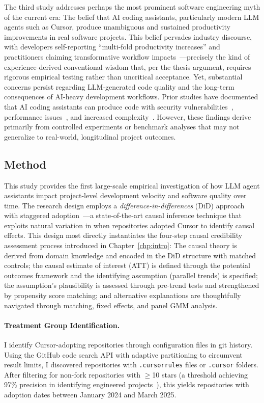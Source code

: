 The third study addresses perhaps the most prominent software engineering myth of the current era: The belief that AI coding assistants, particularly modern LLM agents such as Cursor, produce unambiguous and sustained productivity improvements in real software projects.
This belief pervades industry discourse, with developers self-reporting ``multi-fold productivity increases'' and practitioners claiming transformative workflow impacts~\cite{cursor-reddit-survey, cursor-10x}---precisely the kind of experience-derived conventional wisdom that, per the thesis argument, requires rigorous empirical testing rather than uncritical acceptance.
Yet, substantial concerns persist regarding LLM-generated code quality and the long-term consequences of AI-heavy development workflows.
Prior studies have documented that AI coding assistants can produce code with security vulnerabilities~\cite{DBLP:conf/sp/PearceA0DK22, DBLP:conf/ccs/PerryS0B23}, performance issues~\cite{DBLP:conf/issre/LiC0X0S24}, and increased complexity~\cite{DBLP:journals/tse/LiuTLZZ24}.
However, these findings derive primarily from controlled experiments or benchmark analyses that may not generalize to real-world, longitudinal project outcomes.

\subsection{Method}

This study provides the first large-scale empirical investigation of how LLM agent assistants impact project-level development velocity and software quality over time.
The research design employs a \emph{difference-in-differences} (DiD) approach with staggered adoption~\cite{borusyak2024revisiting}---a state-of-the-art causal inference technique that exploits natural variation in when repositories adopted Cursor to identify causal effects.
This design most directly instantiates the four-step causal credibility assessment process introduced in Chapter~\ref{chp:intro}: The causal theory is derived from domain knowledge and encoded in the DiD structure with matched controls; the causal estimate of interest (ATT) is defined through the potential outcomes framework and the identifying assumption (parallel trends) is specified; the assumption's plausibility is assessed through pre-trend tests and strengthened by propensity score matching; and alternative explanations are thoughtfully navigated through matching, fixed effects, and panel GMM analysis.

\paragraph{Treatment Group Identification.}
I identify Cursor-adopting repositories through configuration files in git history.
Using the GitHub code search API with adaptive partitioning to circumvent result limits, I discovered repositories with \texttt{.cursorrules} files or \texttt{.cursor} folders.
After filtering for non-fork repositories with $\geq$10 stars (a threshold achieving 97\% precision in identifying engineered projects~\cite{DBLP:journals/ese/MunaiahKCN17}), this yields \numtreated repositories with adoption dates between January 2024 and March 2025.

